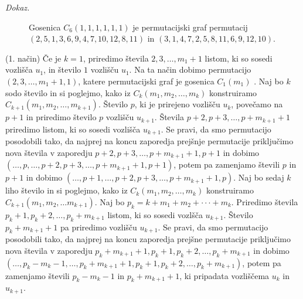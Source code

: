 \documentclass[a4paper, 12pt]{book}
\newenvironment{dokaz}{\emph{Dokaz.}\ }{\hspace{\fill}{$\Box$}}
\begin{document}
\begin{dokaz}
\begin{figure}[h]
\begin{center}
        \end{center}
        \caption{ Gosenica $C_6(1, 1, 1, 1, 1, 1)$ je permutacijski graf permutacij $(2, 5, 1, 3, 6, 9, 4, 7, 10, 12, 8, 11)$ in $(3, 1, 4, 7, 2, 5, 8, 11, 6, 9, 12, 10)$.}
        \label{gosenica_dve_permutaciji2}
    \end{figure}

    (1. način) Če je $k = 1$, priredimo števila $2, 3,\dots, m_1+1$ listom, ki so sosedi vozlišča $u_1$, in  število $1$ vozlišču $u_1$. Na ta način dobimo permutacijo $(2, 3,\dots, m_1+1, 1)$, katere permutacijski graf je gosenica $C_1(m_1)$ . Naj bo $k$ sodo število in si poglejmo, kako iz $C_k(m_1, m_2, \dots, m_k)$ konstruiramo $C_{k+1}(m_1, m_2, \dots, m_{k+1})$. Število $p$, ki je prirejeno vozlišču $u_k$, povečamo na $p+1$ in priredimo število $p$ vozlišču $u_{k+1}$. Števila $p+2, p+3, \dots, p+m_{k+1}+1$ priredimo listom, ki so sosedi vozlišča $u_{k+1}$. Se pravi, da smo permutacijo posodobili tako, da najprej na koncu zaporedja prejšnje permutacije priključimo nova števila v zaporedju $p+2, p+3, \dots, p+m_{k+1}+1, p+1$ in dobimo $(\dots, p, \dots, p+2, p+3, \dots, p+m_{k+1}+1, p+1)$, potem pa zamenjamo števili $p$ in $p+1$ in dobimo $(\dots, p+1, \dots, p+2, p+3, \dots, p+m_{k+1}+1, p)$. Naj bo sedaj $k$ liho število in si poglejmo, kako iz $C_k(m_1, m_2, \dots, m_k)$ konstruiramo $C_{k+1}(m_1, m_2, \dots m_{k+1})$. Naj bo $p_k = k + m_1 + m_2 + \cdot\cdot\cdot + m_k$. Priredimo števila $p_k+1, p_k+2, \dots, p_k+m_{k+1}$ listom, ki so sosedi vozlšča $u_{k+1}$. Število $p_k+m_{k+1}+1$ pa priredimo vozlišču $u_{k+1}$. Se pravi, da smo permutacijo posodobili tako, da najprej na koncu zaporedja prejšne permutacije priključimo nova števila v zaporedju $p_k + m_{k+1} + 1, p_k+1, p_k+2, \dots,p_k+m_{k+1}$ in dobimo $(\dots, p_k - m_k - 1, \dots, p_k + m_{k+1} + 1, p_k+1, p_k+2,\dots,p_k+m_{k+1})$, potem pa zamenjamo števili $p_k - m_k - 1$ in $p_k + m_{k+1} + 1$, ki pripadata vozliščema $u_k$ in $u_{k+1}$. 


\end{dokaz}
\end{document}
